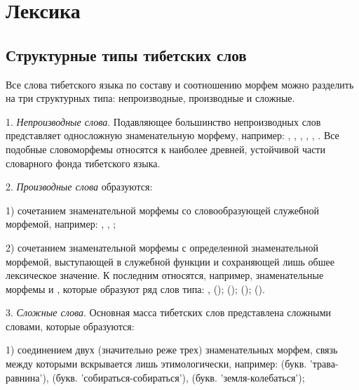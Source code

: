 \chapter{Лексика}

\section{Структурные типы тибетских слов}

Все слова тибетского языка по составу и соотношению морфем можно разделить на три структурных типа: непроизводные, производные и сложные.

1. \emph{Непроизводные слова}. Подавляющее большинство непроизводных слов представляет односложную знаменательную морфему, например: , , , , , . Все подобные словоморфемы относятся к наиболее древней, устойчивой части словарного фонда тибетского языка.

2. \emph{Производные слова} образуются:

1) сочетанием знаменательной морфемы со словообразующей служебной морфемой, например: , , ;

2) сочетанием знаменательной морфемы с определенной знаменательной морфемой, выступающей в служебной функции и сохраняющей лишь обшее лексическое значение. К последним относятся, например, знаменательные морфемы  и , которые образуют ряд слов типа: , ();  ();	 (); 	 
().

3. \emph{Сложные слова}. Основная масса тибетских слов представлена сложными словами, которые образуются:

1) соединением двух (значительно реже трех) знаменательных морфем, связь между которыми вскрывается лишь этимологически, например:  (букв. 'трава-равнина'),  (букв. 'собираться-собираться'),  (букв. 'земля-колебаться');

